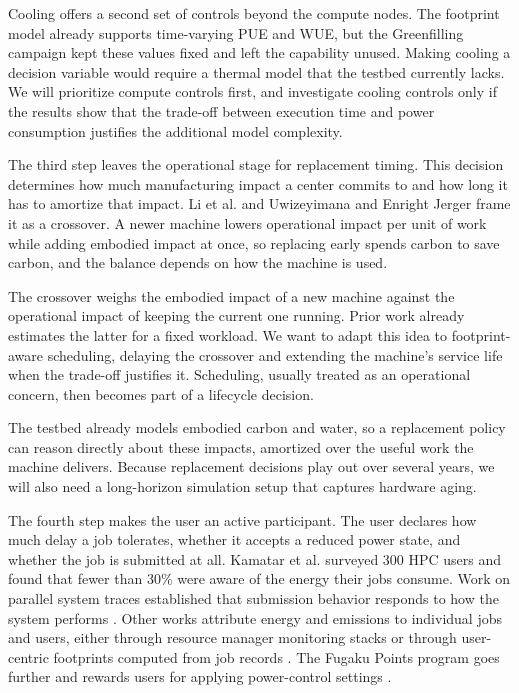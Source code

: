Cooling offers a second set of controls beyond the compute nodes. The footprint model already supports time-varying PUE and WUE, but the Greenfilling campaign kept these values fixed and left the capability unused. Making cooling a decision variable would require a thermal model that the testbed currently lacks. We will prioritize compute controls first, and investigate cooling controls only if the results show that the trade-off between execution time and power consumption justifies the additional model complexity.

The third step leaves the operational stage for replacement timing. This decision determines how much manufacturing impact a center commits to and how long it has to amortize that impact. Li et al. \parencite{li2023Sustainable} and Uwizeyimana and Enright Jerger \parencite{uwizeyimana2025Carbonaware} frame it as a crossover. A newer machine lowers operational impact per unit of work while adding embodied impact at once, so replacing early spends carbon to save carbon, and the balance depends on how the machine is used.

The crossover weighs the embodied impact of a new machine against the operational impact of keeping the current one running. Prior work already estimates the latter for a fixed workload. We want to adapt this idea to footprint-aware scheduling, delaying the crossover and extending the machine's service life when the trade-off justifies it. Scheduling, usually treated as an operational concern, then becomes part of a lifecycle decision.

The testbed already models embodied carbon and water, so a replacement policy can reason directly about these impacts, amortized over the useful work the machine delivers. Because replacement decisions play out over several years, we will also need a long-horizon simulation setup that captures hardware aging.

The fourth step makes the user an active participant. The user declares how much delay a job tolerates, whether it accepts a reduced power state, and whether the job is submitted at all. Kamatar et al. \parencite{kamatar2025Core} surveyed 300 HPC users and found that fewer than 30\% were aware of the energy their jobs consume. Work on parallel system traces established that submission behavior responds to how the system performs \parencite{shmueli2007Uncovering}. Other works attribute energy and emissions to individual jobs and users, either through resource manager monitoring stacks \parencite{paipuri2025CEEMS} or through user-centric footprints computed from job records \parencite{wassermann2024Calculating, niewenhuis2024FootPrinter}. The Fugaku Points program goes further and rewards users for applying power-control settings \parencite{solorzano2024Sustainable}.

